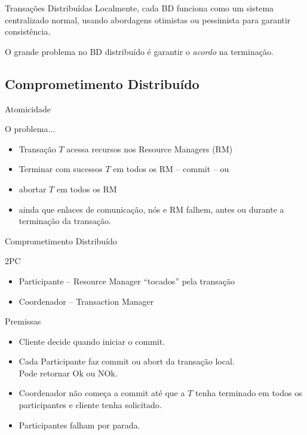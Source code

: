 \begin{frame}{Transações Distribuídas}
Localmente, cada BD funciona como um sistema centralizado normal, usando abordagens otimistas ou pessimista para garantir consistência.

O grande problema no BD distribuído é garantir o \emph{acordo} na terminação.
\end{frame}

\subsection{Comprometimento Distribuído}

\begin{frame}{Atomicidade}
\begin{block}{O problema...}
	\begin{itemize}
		\item Transação $T$ acessa recursos nos Resource Managers (RM)
		\item Terminar com sucessos $T$ em todos os RM -- commit -- ou
		\item abortar $T$ em todos os RM
		\item ainda que enlaces de comunicação, nós e RM falhem, antes ou durante a terminação da transação.
	\end{itemize}
\end{block}

\alert{Comprometimento Distribuído}
\end{frame}

\begin{frame}{2PC}
\begin{itemize}
	\item Participante -- Resource Manager ``tocados'' pela transação
	\item Coordenador -- Transaction Manager
\end{itemize}
\end{frame}


\begin{frame}{Premissas}
\begin{itemize}
	\item Cliente decide quando iniciar o commit.
	\item Cada Participante faz commit ou abort da transação local.\\
		  Pode retornar Ok ou NOk.
	\item Coordenador não começa a commit até que a $T$ tenha terminado em todos os participantes e cliente tenha solicitado.
	\item Participantes falham por parada.
\end{itemize}
\end{frame}



